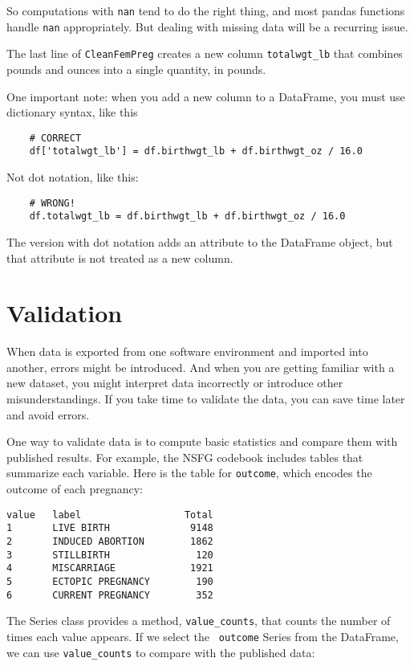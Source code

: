 \documentclass[12pt]{book}
\begin{document}
So computations with {\tt nan} tend to do the right thing, and most
pandas functions handle {\tt nan} appropriately.  But dealing with
missing data will be a recurring issue.

The last line of {\tt CleanFemPreg} creates a new
column \verb"totalwgt_lb" that combines pounds and ounces into
a single quantity, in pounds.

One important note: when you add a new column to a DataFrame, you
must use dictionary syntax, like this

\begin{verbatim}
    # CORRECT
    df['totalwgt_lb'] = df.birthwgt_lb + df.birthwgt_oz / 16.0 
\end{verbatim}

Not dot notation, like this:

\begin{verbatim}
    # WRONG!
    df.totalwgt_lb = df.birthwgt_lb + df.birthwgt_oz / 16.0 
\end{verbatim}

The version with dot notation adds an attribute to the DataFrame
object, but that attribute is not treated as a new column.


\section{Validation}

When data is exported from one software environment and imported into
another, errors might be introduced.  And when you are
getting familiar with a new dataset, you might interpret data
incorrectly or introduce other misunderstandings.  If you take
time to validate the data, you can save time later and avoid errors.

One way to validate data is to compute basic statistics and compare
them with published results.  For example, the NSFG codebook includes
tables that summarize each variable.  Here is the table for
{\tt outcome}, which encodes the outcome of each pregnancy:

\begin{verbatim}
value   label                  Total
1       LIVE BIRTH              9148
2       INDUCED ABORTION        1862
3       STILLBIRTH               120
4       MISCARRIAGE             1921
5       ECTOPIC PREGNANCY        190
6       CURRENT PREGNANCY        352
\end{verbatim}

The Series class provides a method, \verb"value_counts", that
counts the number of times each value appears.  If we select the {\tt
  outcome} Series from the DataFrame, we can use \verb"value_counts"
to compare with the published data:
\end{document}

